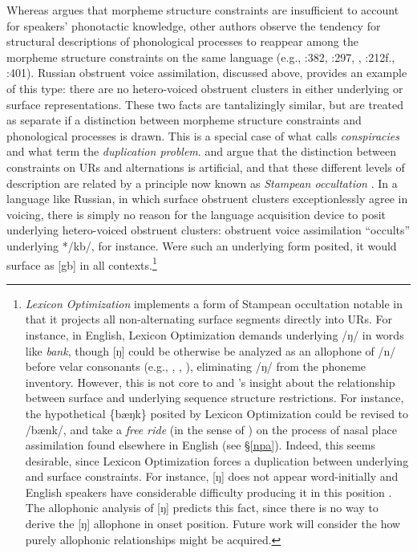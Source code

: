 Whereas \citeauthor{Shibatani1973} argues that morpheme structure constraints are insufficient to account for speakers' phonotactic knowledge, other authors observe the tendency for structural descriptions of phonological processes to reappear among the morpheme structure constraints on the same language (e.g., \citealt{SPE}:382, \citealt{Hale1965}:297, \citealt{Kisseberth1970b}, 
\citealt{Postal1968}:212f., \citealt{Stanley1967}:401).
Russian obstruent voice assimilation, discussed above, provides an example of this type: there are no hetero-voiced obstruent clusters in either underlying or surface representations.
These two facts are tantalizingly similar, but are treated as separate if a distinction between morpheme structure constraints and phonological processes is drawn.
This is a special case of what \citet{Kisseberth1970b} calls \emph{conspiracies} and what \citet[136]{KK77} term the \emph{duplication problem}.
\citet[205f.]{Dell1973} and \citet[28f.]{Stampe1973} argue that the distinction between constraints on URs and alternations is artificial, and that these different levels of description are related by a principle now known as \emph{Stampean occultation} \citep[54]{OT}.
In a language like Russian, in which surface obstruent clusters exceptionlessly agree in voicing, there is simply no reason for the language acquisition device to posit underlying hetero-voiced obstruent clusters: obstruent voice assimilation ``occults'' underlying */kb/, for instance. 
Were such an underlying form posited, it would surface as [gb] in all contexts.\footnote{
    \emph{Lexicon Optimization} \citep[209]{OT} implements a form of Stampean occultation notable in that it projects all non-alternating surface segments directly into URs.
    For instance, in English, Lexicon Optimization demands underlying /ŋ/ in words like \emph{bank}, though [ŋ] could be otherwise be analyzed as an allophone of /n/ before velar consonants (e.g., \citealt[65f.]{Borowsky1986}, \citealt[85]{SPE}, \citealt[62]{Halle1985a}), eliminating /ŋ/ from the phoneme inventory.
    However, this is not core to \citeauthor{Dell1973} and \citeauthor{Stampe1973}'s insight about the relationship between surface and underlying sequence structure restrictions.
    For instance, the hypothetical \{bæŋk\} posited by Lexicon Optimization could be revised to /bænk/, and take a \emph{free ride} (in the sense of \citealt{Zwicky1970}) on the process of nasal place assimilation found elsewhere in English (see \S\ref{npa}).
    Indeed, this seems desirable, since Lexicon Optimization forces a duplication between underlying and surface constraints.
    For instance, [ŋ] does not appear word-initially and English speakers have considerable difficulty producing it in this position \citep{Rusaw2009}.
    The allophonic analysis of [ŋ] predicts this fact, since there is no way to derive the [ŋ] allophone in onset position.
    Future work will consider the how purely allophonic relationships might be acquired.}
